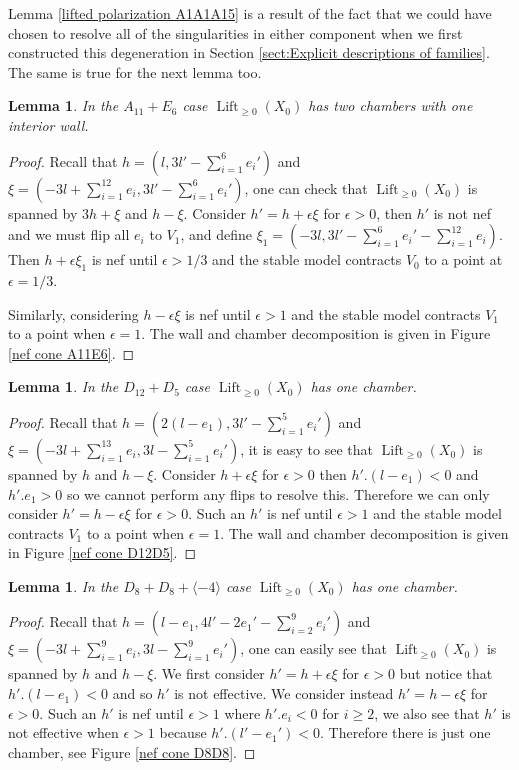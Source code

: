 \documentclass[a4paper]{amsart}
\theoremstyle{definition}
\theoremstyle{plain}
\newtheorem{lemma}[defn]{Lemma}
\theoremstyle{remark}
\begin{document}
Lemma \ref{lifted polarization A1A1A15} is a result of the fact that we could have chosen to resolve all of the singularities in either component when we first constructed this degeneration in Section \ref{sect:Explicit descriptions of families}. The same is true for the next lemma too.
\FloatBarrier
\begin{lemma}
In the $A_{11}+E_6$ case $\operatorname{Lift}_{\geq 0}(X_0)$ has two chambers with one interior wall.
\end{lemma}
\FloatBarrier
\begin{proof}
\FloatBarrier
Recall that $h=(l,3l'-\sum_{i=1}^6e_i')$ and $\xi = (-3l+\sum_{i=1}^{12}e_i,3l'-\sum_{i=1}^6e_i')$, one can check that $\operatorname{Lift}_{\geq 0}(X_0)$ is spanned by $3h+\xi$ and $h-\xi$. Consider $h'=h+\epsilon\xi$ for $\epsilon>0$, then $h'$ is not nef and we must flip all $e_i$ to $V_1$, and define $\xi_1=(-3l,3l'-\sum_{i=1}^6e_i'-\sum_{i=1}^{12}e_i)$. Then $h+\epsilon\xi_1$ is nef until $\epsilon>1/3$ and the stable model contracts $V_0$ to a point at $\epsilon=1/3$.

Similarly, considering $h-\epsilon\xi$ is nef until $\epsilon>1$ and the stable model contracts $V_1$ to a point when $\epsilon=1$. The wall and chamber decomposition is given in Figure \ref{nef cone A11E6}.
\end{proof}
\FloatBarrier
\begin{lemma}
In the $D_{12}+D_5$ case $\operatorname{Lift}_{\geq 0}(X_0)$ has one chamber.
\end{lemma}
\FloatBarrier
\begin{proof}
Recall that $h=(2(l-e_1),3l'-\sum_{i=1}^5e_i')$ and $\xi=(-3l+\sum_{i=1}^{13}e_i,3l-\sum_{i=1}^5e_i')$, it is easy to see that $\operatorname{Lift}_{\geq 0}(X_0)$ is spanned by $h$ and $h-\xi$. Consider $h+\epsilon\xi$ for $\epsilon >0$ then $h'.(l-e_1)<0$ and  $h'.e_1>0$ so we cannot perform any flips to resolve this. Therefore we can only consider $h'=h-\epsilon\xi$ for $\epsilon >0$. Such an $h'$ is nef until $\epsilon >1$ and the stable model contracts $V_1$ to a point when $\epsilon=1$. The wall and chamber decomposition is given in Figure \ref{nef cone D12D5}.
\end{proof}
\FloatBarrier
\begin{lemma}
In the $D_8+D_8+\langle -4\rangle$ case $\operatorname{Lift}_{\geq 0}(X_0)$ has one chamber.
\end{lemma}

\begin{proof}
Recall that $h=(l-e_1,4l'-2e_1'-\sum_{i=2}^9e_i')$ and $\xi=(-3l+\sum_{i=1}^9e_i,3l-\sum_{i=1}^9e_i')$, one can easily see that $\operatorname{Lift}_{\geq 0}(X_0)$ is spanned by $h$ and $h-\xi$. We first consider $h'=h+\epsilon\xi$ for $\epsilon>0$ but notice that $h'. (l-e_1)<0$ and so $h'$ is not effective. We consider instead $h'=h-\epsilon\xi$ for $\epsilon >0$. Such an $h'$ is nef until $\epsilon >1$ where $h'. e_i <0$ for $i\geq 2$, we also see that $h'$ is not effective when $\epsilon >1$ because $h'. (l'-e_1')<0$. Therefore there is just one chamber, see Figure \ref{nef cone D8D8}.
\end{proof}
\end{document}
